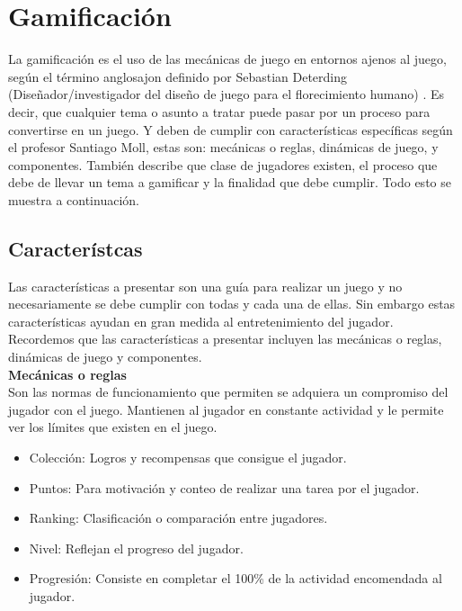 \section{Gamificación}
La gamificación es el uso de las mecánicas de juego en entornos ajenos al juego, según el término anglosajon definido por Sebastian Deterding (Diseñador/investigador del diseño de juego para el florecimiento humano) \cite{gameDef}. Es decir, que cualquier tema o asunto a tratar puede pasar por un proceso para convertirse en un juego. Y deben de cumplir con características específicas según el profesor Santiago Moll\cite{gameficacion}, estas son: mecánicas o reglas, dinámicas de juego, y componentes. También describe que clase de jugadores existen, el proceso que debe de llevar un tema a gamificar y la finalidad que debe cumplir. Todo esto se muestra a continuación.
\\[1pt]

\subsection{Característcas}
Las características a presentar son una guía para realizar un juego y no necesariamente se debe cumplir con todas y cada una de ellas. Sin embargo estas características ayudan en gran medida al entretenimiento del jugador. Recordemos que las características a presentar incluyen las mecánicas o reglas, dinámicas de juego y componentes.
\\[1pt]
 
\textbf{Mecánicas o reglas}
\\[1pt]
Son las normas de funcionamiento que permiten se adquiera un compromiso del jugador con el juego. Mantienen al jugador en constante actividad y le permite ver los límites que existen en el juego.
\\[1pt]

\begin{itemize}
	\item Colección: Logros y recompensas que consigue el jugador.
	\item Puntos: Para motivación y conteo de realizar una tarea por el jugador.
	\item Ranking: Clasificación o comparación entre jugadores.
	\item Nivel: Reflejan el progreso del jugador.
	\item Progresión: Consiste en completar el 100\% de la actividad encomendada al jugador.	
\end{itemize}

